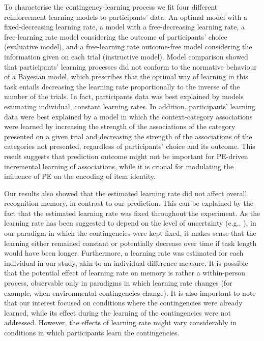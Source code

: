 \documentclass[a4paper,12pt]{article}
\begin{document}
 \par
To characterise the contingency-learning process we fit four different reinforcement learning models to participants' data: An optimal model with a fixed-decreasing learning rate, a model with a free-decreasing learning rate, a free-learning rate model considering the outcome of participants' choice (evaluative model), and a free-learning rate outcome-free model considering the information given on each trial (instructive model). Model comparison showed that participants' learning processes did not conform to the normative behaviour of a Bayesian model, which prescribes that the optimal way of learning in this task entails decreasing the learning rate proportionally to the inverse of the number of the trials. In fact, participants data was best explained by models estimating individual, constant learning rates. In addition, participants' learning data were best explained by a model in which the context-category associations were learned by increasing the strength of the associations of the category presented on a given trial and decreasing the strength of the associations of the categories not presented, regardless of participants' choice and its outcome. This result suggests that prediction outcome might not be important for PE-driven incremental learning of associations, while it is crucial for modulating the influence of PE on the encoding of item identity.  \par
Our results also showed that the estimated learning rate did not affect overall recognition memory, in contrast to our prediction. This can be explained by the fact that the estimated learning rate was fixed throughout the experiment. As the learning rate has been suggested to depend on the level of uncertainty (e.g., \citealp{Behrens2007}), in our paradigm in which the contingencies were kept fixed, it makes sense that the learning either remained constant or potentially decrease over time if task length would have been longer.
Furthermore, a learning rate was estimated for each individual in our study, akin to an individual difference measure. It is possible that the potential effect of learning rate on memory is rather a within-person process, observable only in paradigms in which learning rate changes (for example, when environmental contingencies change).
It is also important to note that our interest focused on conditions where the contingencies were already learned, while its effect during the learning of the contingencies were not addressed. However, the effects of learning rate might vary considerably in conditions in which participants learn the contingencies. 
\end{document}
